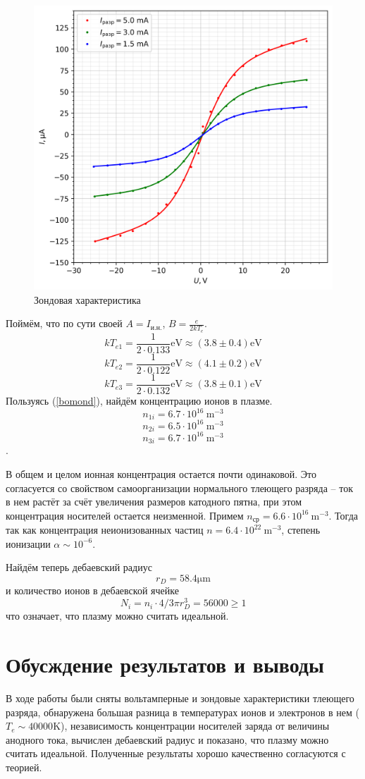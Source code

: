 \documentclass[12pt, a4paper]{article}
\begin{document}
\begin{figure}[]
\centering
\includegraphics[width=0.6\linewidth]{pics/zond}
\caption{Зондовая характеристика}
\label{amplot}
\end{figure}

Поймём, что по сути своей $A = I_\text{и.н.}$, $B = \frac{e}{2kT_e}$.
$$kT_{e1} = \frac{1}{2\cdot0.133} \mathrm{eV}\approx(3.8\pm0.4) \mathrm{eV}$$
$$kT_{e2} = \frac{1}{2\cdot0.122} \mathrm{eV}\approx(4.1\pm0.2) \mathrm{eV}$$
$$kT_{e3} = \frac{1}{2\cdot0.132} \mathrm{eV}\approx(3.8\pm0.1) \mathrm{eV}$$
\newpage
Пользуясь (\ref{bomond}), найдём концентрацию ионов в плазме.
$$n_{1i} = 6.7\cdot 10^{16}~\mathrm{m}^{-3}$$
$$n_{2i} = 6.5\cdot 10^{16}~\mathrm{m}^{-3}$$
$$n_{3i} = 6.7\cdot 10^{16}~\mathrm{m}^{-3}$$.

В общем и целом ионная концентрация остается почти одинаковой. Это согласуется со свойством самоорганизации нормального тлеющего разряда -- ток в нем растёт за счёт увеличения размеров катодного пятна, при этом концентрация носителей остается неизменной. Примем $n_{ср} = 6.6\cdot 10^{16}~\mathrm{m}^{-3}$. Тогда так как концентрация неионизованных частиц $n = 6.4 \cdot 10^{22}~\mathrm{m}^{-3}$, степень ионизации $\alpha \sim 10^{-6}$.

Найдём теперь дебаевский радиус
$$r_D = 58.4 \mathrm{\mu m}$$
и количество ионов в дебаевской ячейке
$$N_i = {n_i} \cdot {4/3 \pi r_D ^3} = 56000 \geq 1$$
что означает, что плазму можно считать идеальной.

\section{Обусждение результатов и выводы}
В ходе работы были сняты вольтамперные и зондовые характеристики тлеющего разряда, обнаружена большая разница в температурах ионов и электронов в нем ($T_e \sim 40000 \mathrm{K}$), независимость концентрации носителей заряда от величины анодного тока, вычислен дебаевский радиус и показано, что плазму можно считать идеальной. Полученные результаты хорошо качественно согласуются с теорией. 
\newpage
\end{document}
